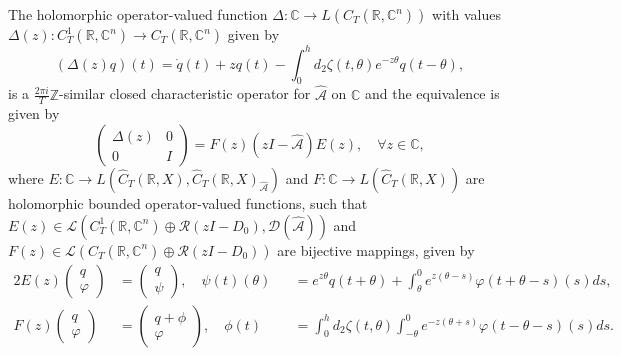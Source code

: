\documentclass[english]{myarticle}
\begin{document}
\begin{sloppypar}
\begin{theorem} \label{thm:charmatrixDDE}
The holomorphic operator-valued function $\Delta : \mathbb{C} \to L(C_T(\mathbb{R},\mathbb{C}^n))$ with values $\Delta(z) : C_T^1(\mathbb{R},\mathbb{C}^n) \to C_T(\mathbb{R},\mathbb{C}^n)$ given by
\begin{equation} \label{eq:DeltaDDE}
     (\Delta(z)q)(t) = \dot{q}(t) + z q(t) - \int_0^h d_2 \zeta(t,\theta) e^{-z \theta} q(t-\theta),
\end{equation}
is a $\frac{2\pi i}{T}\mathbb{Z}$-similar closed characteristic operator for $\hat{\mathcal{A}}$ on $\mathbb{C}$ and the equivalence is given by
\begin{equation} \label{eq:charoperatorAhatDDE}
     \begin{pmatrix}
         \Delta(z) & 0 \\
         0 & I 
     \end{pmatrix}
     =
     F(z)(z I - \hat{\mathcal{A}})E(z), \quad \forall z \in \mathbb{C},
 \end{equation}
where $E : \mathbb{C} \to L(\hat{C}_T(\mathbb{R},X),\hat{C}_T(\mathbb{R},X)_{\hat{\mathcal{A}}})$ and $F : \mathbb{C} \to L(\hat{C}_T(\mathbb{R},X))$ are holomorphic bounded operator-valued functions, such that $E(z) \in \mathcal{L}(C_T^1(\mathbb{R},\mathbb{C}^n) \oplus \mathcal{R}(zI-D_0), \mathcal{D}(\hat{\mathcal{A}}))$ and $F(z) \in \mathcal{L}(C_T(\mathbb{R},\mathbb{C}^n) \oplus \mathcal{R}(zI-D_0))$ are bijective mappings, given by
\begin{alignat*}{2}
     E(z)
     \begin{pmatrix}
     q\\
     \varphi
     \end{pmatrix}
     &=
     \begin{pmatrix}
     q\\
     \psi
     \end{pmatrix}, \quad
         \psi(t)(\theta) &&= e^{z \theta}q(t+\theta)+ \int_{\theta}^0 e^{z(\theta-s)}\varphi(t+\theta-s)(s) ds, \\
     F(z)
     \begin{pmatrix}
     q\\
     \varphi
     \end{pmatrix}
     &=
     \begin{pmatrix}
     q + \phi\\
     \varphi
     \end{pmatrix}, \quad
         \phi(t) &&= \int_0^h d_2\zeta(t,\theta) \int_{-\theta}^0 e^{-z(\theta+s)}\varphi(t-\theta-s)(s) ds.

\end{alignat*}
\end{theorem}
\end{sloppypar}
\end{document}

